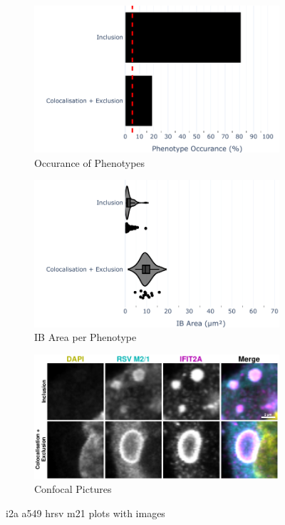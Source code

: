 \begin{figure}
    \begin{subfigure}{0.5\textwidth}
        \includegraphics[width=1\linewidth]{10. Chapter 5/Figs/01. Infection/01. IFIT2A/07. bar_i2a_a549-m21.pdf} 
        \caption[]{Occurance of Phenotypes}
    \end{subfigure}
    \begin{subfigure}{0.5\textwidth}
        \includegraphics[width=1\linewidth]{10. Chapter 5/Figs/01. Infection/01. IFIT2A/08. violin_i2a_a549-m21.pdf}
        \caption[]{IB Area per Phenotype}
    \end{subfigure}

    \begin{subfigure}{1\textwidth}
        \includegraphics[width=1\linewidth]{10. Chapter 5/Figs/01. Infection/01. IFIT2A/09. i2a a549 hrsv m21.pdf} 
        \caption[]{Confocal Pictures}
    \end{subfigure}
    \caption[i2a a549 hrsv m21 plots with images]{i2a a549 hrsv m21 plots with images}
    \label{fig:i2a a549 hrsv m21 plots with images}
\end{figure}

